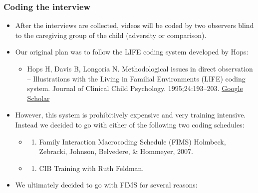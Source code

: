 \documentclass[]{book}
\providecommand{\tightlist}{%
  \setlength{\itemsep}{0pt}\setlength{\parskip}{0pt}}
\begin{document}
\hypertarget{coding-the-interview}{%
\subsubsection{Coding the interview}\label{coding-the-interview}}

\begin{itemize}
\item
  After the interviews are collected, videos will be coded by two observers blind to the caregiving group of the child (adversity or comparison).
\item
  Our original plan was to follow the LIFE coding system developed by Hops:

  \begin{itemize}
  \tightlist
  \item
    Hops H, Davis B, Longoria N. Methodological issues in direct observation -- Illustrations with the Living in Familial Environments (LIFE) coding system. Journal of Clinical Child Psychology. 1995;24:193--203. \href{https://www.tandfonline.com/doi/abs/10.1207/s15374424jccp2402_7?journalCode=hcap19}{Google Scholar}
  \end{itemize}
\item
  However, this system is prohibitively expensive and very training intensive. Instead we decided to go with either of the following two coding schedules:

  \begin{itemize}
  \item
    \begin{enumerate}
    \def\labelenumi{\arabic{enumi}.}
    \tightlist
    \item
      Family Interaction Macrocoding Schedule (FIMS) Holmbeck, Zebracki, Johnson, Belvedere, \& Hommeyer, 2007.
    \end{enumerate}
  \item
    \begin{enumerate}
    \def\labelenumi{\arabic{enumi}.}
    \setcounter{enumi}{1}
    \tightlist
    \item
      CIB Training with Ruth Feldman.
    \end{enumerate}
  \end{itemize}
\item
  We ultimately decided to go with FIMS for several reasons:


\end{itemize}
\end{document}
